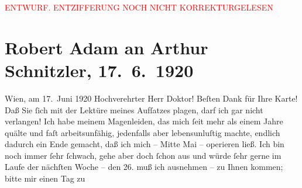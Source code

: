 
\begin{center}
            \textcolor{red}{ENTWURF. ENTZIFFERUNG NOCH NICHT KORREKTURGELESEN}
                      \end{center}
            
               \section[Robert Adam an Arthur Schnitzler, 17. 6. 1920]{ Robert Adam an Arthur Schnitzler, 17. 6. 1920}\nopagebreak{}\rehead{ }\begin{ledgroupsized}[t]{13cm}\normalsize\beginnumbering{} \toendnotes[C]{\smallbreak\pagebreak[2]} 
\toendnotes[C]{\smallbreak}\pstart
           \raggedleft{}{\pb}Wien, am 17. Juni 1920\pend
           \pstart\center{}Hochverehrter Herr Doktor!\pend\pstart
           Beſten Dank für Ihre Karte! Daß Sie ſich mit der Lektüre meines Aufſatzes plagen, darf ich gar nicht
                    verlangen!\pend
           \pstart
           Ich habe meinem Magenleiden, das mich ſeit mehr als einem Jahre quälte und faſt
                    arbeitsunfähig, jedenfalls aber lebensunluſtig machte, endlich dadurch ein Ende
                    gemacht, daß ich mich – Mitte Mai – operieren ließ. Ich bin noch
                    immer ſehr ſchwach, gehe aber doch ſchon aus und würde ſehr gerne {\pb}im Laufe der nächſten Woche – den
                        26. muß ich ausnehmen – zu Ihnen kommen; bitte mir einen Tag zu

\end{ledgroupsized}
